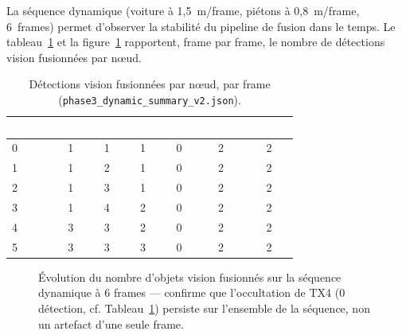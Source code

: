 \documentclass[12pt,a4paper,titlepage]{article}
\newcommand{\hd}[1]{\textcolor{white}{\textbf{#1}}}
\begin{document}
La séquence dynamique (voiture à 1,5~m/frame, piétons à 0,8~m/frame, 6~frames) permet d'observer la stabilité du pipeline de fusion dans le temps. Le tableau~\ref{tab:res_dynamic} et la figure~\ref{fig:chart_dynamic} rapportent, frame par frame, le nombre de détections vision fusionnées par n\oe ud.

\begin{table}[H]
    \centering
    \caption{Détections vision fusionnées par n\oe ud, par frame (\texttt{phase3\_dynamic\_summary\_v2.json}).}
    \label{tab:res_dynamic}
    \begin{tabular}{lcccccc}
        \toprule
        \rowcolor{tabhead}
        \hd{Frame} & \hd{TX1} & \hd{TX2} & \hd{TX3} & \hd{TX4} & \hd{ped\_a} & \hd{ped\_b} \\
        \midrule
        0 & 1 & 1 & 1 & 0 & 2 & 2 \\
        1 & 1 & 2 & 1 & 0 & 2 & 2 \\
        2 & 1 & 3 & 1 & 0 & 2 & 2 \\
        3 & 1 & 4 & 2 & 0 & 2 & 2 \\
        4 & 3 & 3 & 2 & 0 & 2 & 2 \\
        5 & 3 & 3 & 3 & 0 & 2 & 2 \\
        \bottomrule
    \end{tabular}
\end{table}

\begin{figure}[H]
    \centering
    \caption{Évolution du nombre d'objets vision fusionnés sur la séquence dynamique à 6 frames --- confirme que l'occultation de TX4 (0 détection, cf. Tableau~\ref{tab:res_dynamic}) persiste sur l'ensemble de la séquence, non un artefact d'une seule frame.}
    \label{fig:chart_dynamic}
\end{figure}
\end{document}
